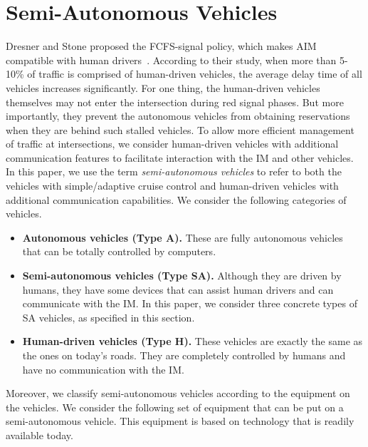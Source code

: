 \section{Semi-Autonomous Vehicles}
\label{sec:vehicles}

Dresner and Stone proposed the FCFS-signal policy, which makes AIM
compatible with human drivers~\cite{bib:Dresner07Sharing}.  According
to their study, when more than 5-10\% of traffic is comprised of
human-driven vehicles, the average delay time of all vehicles
increases significantly.  For one thing, the human-driven vehicles
themselves may not enter the intersection during red signal phases.
But more importantly, they prevent the autonomous vehicles from
obtaining reservations when they are behind such stalled vehicles.  To
allow more efficient management of traffic at intersections, we
consider human-driven vehicles with additional communication features
to facilitate interaction with the IM and other vehicles. In this
paper, we use the term \emph{semi-autonomous vehicles} to refer to
both the vehicles with simple/adaptive cruise control and human-driven
vehicles with additional communication capabilities. We consider the
following categories of vehicles.

\begin{itemize}

\item \textbf{Autonomous vehicles (Type A).} These are fully
autonomous vehicles that can be totally controlled by computers.

\item \textbf{Semi-autonomous vehicles (Type SA).}
Although they are driven by humans,
they have some devices that can assist human drivers and
can communicate with the IM. In this paper, 
we consider three concrete types of SA vehicles, 
as specified in this section.

\item \textbf{Human-driven vehicles (Type H).}
These vehicles are exactly the same as the ones on today's
roads. They are completely controlled by humans and have no
communication with the IM.

\end{itemize}

Moreover, we classify semi-autonomous vehicles according to the
equipment on the vehicles. We consider the following set of
equipment that can be put on a semi-autonomous vehicle.  This
equipment is based on technology that is readily available today.

